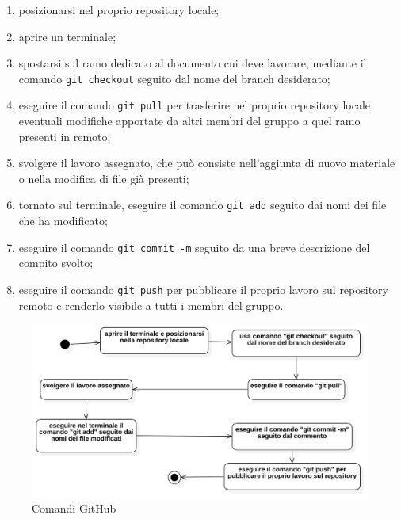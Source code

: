                 \begin{enumerate}
                    \item posizionarsi nel proprio repository locale;
                    \item aprire un terminale;
                    \item spostarsi sul ramo dedicato al documento cui deve lavorare, mediante il comando \texttt{git checkout} seguito dal nome del branch desiderato;
                    \item eseguire il comando \texttt{git pull} per trasferire nel proprio repository locale eventuali modifiche apportate da altri membri del gruppo a quel ramo presenti in remoto;
                    \item svolgere il lavoro assegnato, che può consiste nell'aggiunta di nuovo materiale o nella modifica di file già presenti;
                    \item tornato sul terminale, eseguire il comando \texttt{git add} seguito dai nomi dei file che ha modificato;
                    \item eseguire il comando \texttt{git commit -m} seguito da una breve descrizione del compito svolto;
                    \item eseguire il comando \texttt{git push} per pubblicare il proprio lavoro sul repository remoto e renderlo visibile a tutti i membri del gruppo.
                \end{enumerate}
                
                \begin{figure}[H]
                        \centering
                        \includegraphics[width=1.0\textwidth]{res/images/comandi_GitHub.png}
                    \caption{Comandi GitHub}
                    \label{Comandi GitHub: diagramma delle attività di modifica al Repository}
                \end{figure}
                
